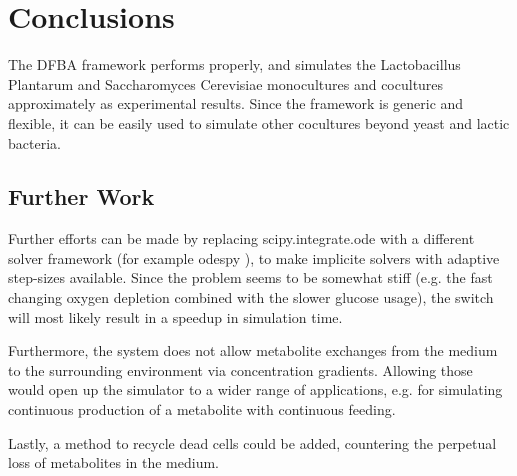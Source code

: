 \section{Conclusions}\label{sec:conclusions}
	The DFBA framework performs properly, and simulates the Lactobacillus Plantarum and Saccharomyces Cerevisiae monocultures and cocultures
	approximately as experimental results.
	Since the framework is generic and flexible, it can be easily used to simulate other cocultures beyond yeast and lactic bacteria.
	
	\subsection{Further Work}
		Further efforts can be made by replacing scipy.integrate.ode with a
		different solver framework (for example odespy \cite{odespy}), to make implicite solvers with adaptive step-sizes available.
		Since the problem seems to be somewhat stiff (e.g. the fast changing oxygen depletion combined with the slower glucose usage),
		the switch will most likely result in a speedup in simulation time.
		
		Furthermore, the system does not allow metabolite exchanges from the medium to the surrounding environment via concentration gradients.
		Allowing those would open up the simulator to a wider range of applications, e.g. for simulating continuous production of a metabolite with
		continuous feeding.
		
		Lastly, a method to recycle dead cells could be added, countering the perpetual loss of metabolites in the medium.
